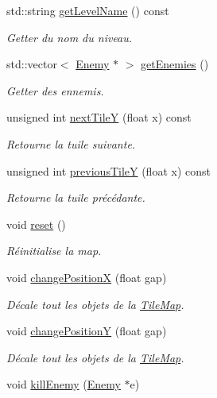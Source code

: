 \begin{DoxyCompactItemize}
std\+::string \hyperlink{class_tile_map_ab498153694e7a79853fc6fb2a10887ad}{get\+Level\+Name} () const 
\begin{DoxyCompactList}\small\item\em Getter du nom du niveau. \end{DoxyCompactList}\item 
std\+::vector$<$ \hyperlink{class_enemy}{Enemy} $\ast$ $>$ \hyperlink{class_tile_map_a67f641da59fdaab20da87bcca89a1038}{get\+Enemies} ()
\begin{DoxyCompactList}\small\item\em Getter des ennemis. \end{DoxyCompactList}\item 
unsigned int \hyperlink{class_tile_map_a72d2f2c89b9521d8632a724b246f6e43}{next\+Tile\+Y} (float x) const 
\begin{DoxyCompactList}\small\item\em Retourne la tuile suivante. \end{DoxyCompactList}\item 
unsigned int \hyperlink{class_tile_map_acca5310b644c02342e0d4829a887d1e7}{previous\+Tile\+Y} (float x) const 
\begin{DoxyCompactList}\small\item\em Retourne la tuile précédante. \end{DoxyCompactList}\item 
void \hyperlink{class_tile_map_a5ee6a66152cf4a52f3232369ac19132f}{reset} ()
\begin{DoxyCompactList}\small\item\em Réinitialise la map. \end{DoxyCompactList}\item 
void \hyperlink{class_tile_map_acf30f34bdb6d18a36db9f1e682afc1a9}{change\+Position\+X} (float gap)
\begin{DoxyCompactList}\small\item\em Décale tout les objets de la \hyperlink{class_tile_map}{Tile\+Map}. \end{DoxyCompactList}\item 
void \hyperlink{class_tile_map_a275b065e4d410f5649b4fcbddbdeae7b}{change\+Position\+Y} (float gap)
\begin{DoxyCompactList}\small\item\em Décale tout les objets de la \hyperlink{class_tile_map}{Tile\+Map}. \end{DoxyCompactList}\item 
void \hyperlink{class_tile_map_a2418329f152f039cf32b060ad4e0db55}{kill\+Enemy} (\hyperlink{class_enemy}{Enemy} $\ast$e)

\end{DoxyCompactItemize}
